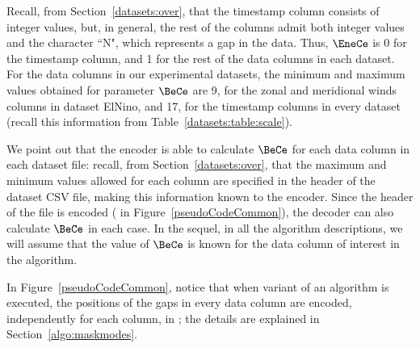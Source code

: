 Recall, from Section~\ref{datasets:over}, that the timestamp column consists of integer values, but, in general, the rest of the columns admit both integer values and the character ``N", which represents a gap in the data. Thus, $\EneCe$ is 0 for the timestamp column, and 1 for the rest of the data columns in each dataset. For the data columns in our experimental datasets, the minimum and maximum values obtained for parameter $\BeCe$ are 9, for the zonal and meridional winds columns in dataset ElNino, and 17, for the timestamp columns in every dataset (recall this information from Table~\ref{datasets:table:scale}).

We point out that the encoder is able to calculate $\BeCe$ for each data column in each dataset file: recall, from Section~\ref{datasets:over}, that the maximum and minimum values allowed for each column are specified in the header of the dataset CSV file, making this information known to the encoder. Since the header of the file is encoded ( in Figure~\ref{pseudoCodeCommon}), the decoder can also calculate $\BeCe$ in each case. In the sequel, in all the algorithm descriptions, we will assume that the value of $\BeCe$ is known for the data column of interest in the algorithm.


\newcommand{\gapLine}{6}
In Figure~\ref{pseudoCodeCommon}, notice that when variant \maskalgo of an algorithm is executed, the positions of the gaps in every data column are encoded, independently for each column, in \Line \gapLine; the details are explained in Section~\ref{algo:maskmodes}.

